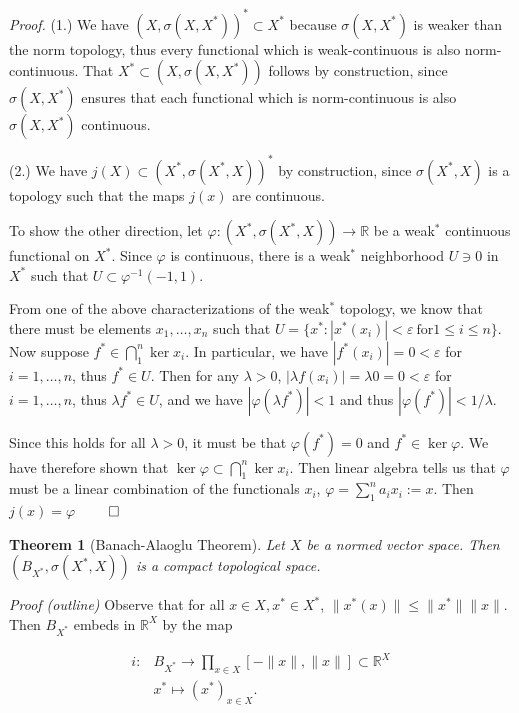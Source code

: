 \documentclass[11pt, reqno]{article}
\theoremstyle{plain}
\newtheorem*{theorem}{Theorem}
\theoremstyle{definition}
\theoremstyle{remark}
\renewcommand{\phi}{\varphi}
\renewcommand{\epsilon}{\varepsilon}
\newcommand{\RR}{\mathbb{R}}
\begin{document}
\textit{Proof.} (1.) We have $(X, \sigma(X, X^*))^* \subset X^*$ because $\sigma(X, X^*)$ is weaker than the norm 
topology, thus every functional which is weak-continuous is also norm-continuous. That $X^* \subset (X, \sigma(X, X^*))$
follows by construction, since $\sigma(X, X^*)$ ensures that each functional which is norm-continuous is also
$\sigma(X, X^*)$ continuous.

(2.) We have $j(X) \subset (X^*, \sigma(X^*, X))^*$ by construction, since $\sigma(X^*, X)$ is a topology 
such that the maps $j(x)$ are continuous. 

To show the other direction, let $\phi: (X^*, \sigma(X^*, X)) \rightarrow \RR$ be a weak$^*$ continuous functional
on $X^*$. Since $\phi$ is continuous, there is a weak$^*$ neighborhood $U \ni 0$ in $X^*$ such that 
$U \subset \phi^{-1}(-1, 1)$.

From one of the above characterizations of the weak$^*$ topology, we know that there must be elements $x_1, \dots, x_n$ 
such that $U = \{x^*: |x^*(x_i)| < \epsilon\ \textrm{for} 1 \leq i \leq n\}$. Now suppose $f^* \in \bigcap_1^n \ker x_i$.
In particular, we have $|f^*(x_i)| = 0 < \epsilon$ for $i = 1, \dots, n$, thus $f^* \in U$. Then for any $\lambda > 0$, 
$|\lambda f(x_i)| = \lambda 0 = 0 < \epsilon$ for $i = 1, \dots, n$, thus $\lambda f^* \in U$, and we have
$|\phi(\lambda f^*)| < 1$ and thus $|\phi(f^*)| < 1/\lambda$. 

Since this holds for all $\lambda > 0$, it must be that $\phi(f^*) = 0$ and $f^* \in \ker\phi$. We have therefore shown
that $\ker\phi \subset \bigcap_1^n \ker x_i$. Then linear algebra tells us that $\phi$ must be a linear combination of
the functionals $x_i$, $\phi = \sum_1^n a_i x_i := x$. Then $j(x) = \phi$ \hfill $\qed$

\begin{theorem}[Banach-Alaoglu Theorem]
    Let $X$ be a normed vector space. Then $(B_{X^*}, \sigma(X^*, X))$ is a compact topological space.
\end{theorem}

\textit{Proof (outline)} Observe that for all $x \in X, x^* \in X^*$, $\|x^*(x)\| \leq \|x^*\|\|x\|$. Then $B_{X^*}$ embeds
in $\RR^X$ by the map 

\begin{align*}
    i: & B_{X^*} \rightarrow \prod_{x \in X} [-\|x\|, \|x\|] \subset \RR^X\\
    & x^* \mapsto (x^*)_{x \in X}.
\end{align*}
\end{document}
